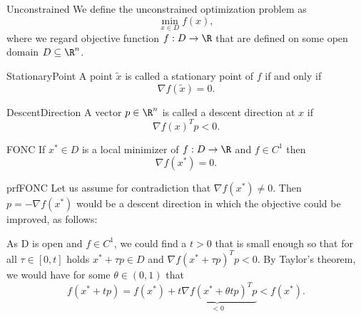 \begin{theo}{Unconstrained}
    We define the unconstrained optimization problem as 
    \begin{equation*}
        \min_{x \in D} f(x),
    \end{equation*}
    where we regard objective function $f: D \to \R$ that are defined on some open domain $D \subseteq \R^n$.
\end{theo}

\begin{theo}{StationaryPoint}
    A point $\tilde{x}$ is called a stationary point of $f$ if and only if 
    \begin{equation*}
        \nabla f(\tilde{x}) = 0.
    \end{equation*}
    \vspace*{-0.5cm}
\end{theo}

\begin{theo}{DescentDirection}
    A vector $p \in \R^n$ is called a descent direction at $x$ if 
    \begin{equation*}
        \nabla f(x)^T p < 0.
    \end{equation*}
    \vspace*{-0.5cm}
\end{theo}

\begin{theo}{FONC}
    If $x^* \in D$ is a local minimizer of $f: D \to \R$ and $f \in C^1$ then 
    \begin{equation*}
        \nabla f(x^*) = 0.
    \end{equation*} 
    \vspace*{-0.5cm}
\end{theo}

\begin{prf}{prfFONC}
    Let us assume for contradiction that $\nabla f(x^*) \neq 0$. Then $p = -\nabla f(x^*)$ would be a descent direction in which the objective could be improved, as follows: 

    \begin{framed}
        As D is open and $f \in C^1$, we could find a $t > 0$ that is small enough so that for all $\tau \in [0,t]$ holds $x^* + \tau p \in D$ and $\nabla {f(x^* + \tau p)}^T p < 0$. By Taylor's theorem, we would have for some $\theta \in (0,1)$ that
        \begin{equation*}
            f(x^* + t p) = f(x^*) + \underbrace{t \nabla {f(x^* + \theta t p)}^T p}_{<0} < f(x^*).
        \end{equation*}
        \vspace*{-0.3cm}
    \end{framed}
    \vspace*{-0.3cm}
\end{prf}

